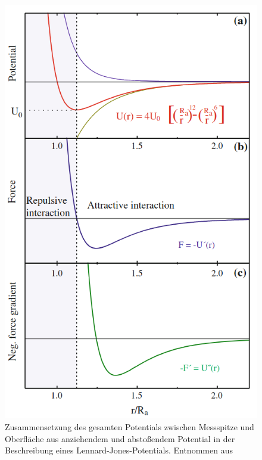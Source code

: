           \begin{figure}
            \includegraphics[scale = 0.3]{pictures/LJ.png}
            \caption{Zusammensetzung des gesamten Potentials zwischen Messspitze und Oberfläche aus anziehendem und abstoßendem Potential in der Beschreibung eines Lennard-Jones-Potentials. Entnommen aus \cite{voigtlander_scanning_2015}}
            \label{fig:LJ}
          \end{figure}

          \FloatBarrier

